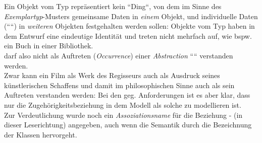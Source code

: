 \noindent
Ein Objekt vom Typ  repräsentiert kein ``Ding``, von dem im Sinne des \textit{Exemplartyp}-Musters gemeinsame Daten in \textit{einem} Objekt, und individuelle Daten (````) in \textit{weiteren} Objekten festgehalten werden sollen: Objekte vom Typ  haben in dem Entwurf eine eindeutige Identität und treten nicht mehrfach auf, wie {bspw.} ein Buch in einer Bibliothek.\\

\noindent
{} darf also nicht als Auftreten (\textit{Occurrence}) einer \textit{Abstraction} ```` verstanden werden.\\
Zwar kann ein Film als Werk des Regisseurs auch als Ausdruck seines künstlerischen Schaffens und damit im philosophischen Sinne auch als sein Auftreten verstanden werden: Bei den geg. Anforderungen ist es aber klar, dass nur die Zugehörigkeitsbeziehung in dem Modell als solche zu modellieren ist.\\

\noindent
Zur Verdeutlichung wurde noch ein \textit{Assoziationsname} für die Beziehung  -  (in dieser Leserichtung) angegeben, auch wenn die Semantik durch die Bezeichnung der Klassen hervorgeht.